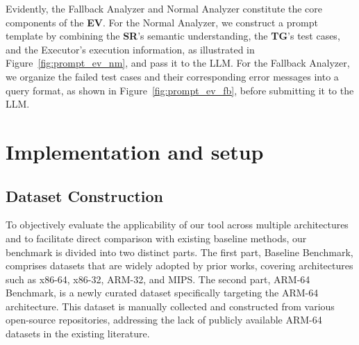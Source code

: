 \documentclass[acmsmall,screen,review,anonymous]{acmart} %
\begin{document}
Evidently, the Fallback Analyzer and Normal Analyzer constitute the core components of the \textbf{EV}. For the Normal Analyzer, we construct a prompt template by combining the \textbf{SR}’s semantic understanding, the \textbf{TG}’s test cases, and the Executor’s execution information, as illustrated in Figure~\ref{fig:prompt_ev_nm}, and pass it to the LLM. For the Fallback Analyzer, we organize the failed test cases and their corresponding error messages into a query format, as shown in Figure~\ref{fig:prompt_ev_fb}, before submitting it to the LLM.




\section{Implementation and setup}


\subsection{Dataset Construction}

To objectively evaluate the applicability of our tool across multiple architectures and to facilitate direct comparison with existing baseline methods, our benchmark is divided into two distinct parts. The first part, Baseline Benchmark\cite{SymGen}, comprises datasets that are widely adopted by prior works, covering architectures such as x86-64, x86-32, ARM-32, and MIPS. The second part, ARM-64 Benchmark, is a newly curated dataset specifically targeting the ARM-64 architecture. This dataset is manually collected and constructed from various open-source repositories, addressing the lack of publicly available ARM-64 datasets in the existing literature.
\end{document}
